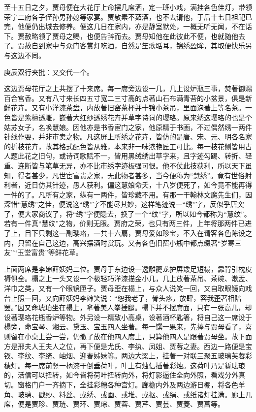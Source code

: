 \begin{parag}
    至十五日之夕，贾母便在大花厅上命摆几席洒，定一班小戏，满挂各色佳灯，带领荣宁二府各子侄孙男孙媳等家宴。贾敬素不茹酒，也不去请他，于后十七日祖祀已完，他便仍出城去修养。便这几日在家内，亦是静室默处，一概无听无闻，不在话下。贾赦略领了贾母之赐，也便告辞而去。贾母知他在此彼此不便，也就随他去了。贾赦自到家中与众门客赏灯吃酒，自然是笙歌聒耳，锦绣盈眸，其取便快乐另与这边不同。\begin{note}庚辰双行夹批：又交代一个。\end{note}
\end{parag}


\begin{parag}
    这边贾母花厅之上共摆了十来席。每一席旁边设一几，几上设炉瓶三事，焚著御赐百合宫香。又有八寸来长四五寸宽二三寸高的点著山石布满青苔的小盆景，俱是新鲜花卉。又有小洋漆茶盘，内放著旧窑茶杯并十锦小茶吊，里面泡著上等名茶。一色皆是紫檀透雕，嵌著大红纱透绣花卉并草字诗词的璎珞。原来绣这璎珞的也是个姑苏女子，名唤慧娘。因他亦是书香宦门之家，他原精于书画，不过偶然绣一两件针线作耍，并非市卖之物。凡这屏上所绣之花卉，皆仿的是唐、宋、元、明各名家的折枝花卉，故其格式配色皆从雅，本来非一味浓艳匠工可比。每一枝花侧皆用古人题此花之旧句，或诗词歌赋不一，皆用黑绒绣出草字来，且字迹勾踢、转折、轻重、连断皆与笔草无异，亦不比市绣字迹板强可恨。他不仗此技获利，所以天下虽知，得者甚少，凡世宦富贵之家，无此物者甚多，当今便称为“慧绣”。竟有世俗射利者，近日仿其针迹，愚人获利。偏这慧娘命夭，十八岁便死了，如今竟不能再得一件的了。凡所有之家，纵有一两件，皆珍藏不用。有那一干翰林文魔先生们，因深惜“慧绣”之佳，便说这“绣”字不能尽其妙，这样笔迹说一“绣”字，反似乎唐突了，便大家商议了，将“绣”字便隐去，换了一个“纹”字，所以如今都称为“慧纹”。若有一件真“慧纹”之物，价则无限。贾府之荣，也只有两三件，上年将那两件已进了上，目下只剩这一副璎珞，一共十六扇，贾母爱如珍宝，不入在请客各色陈设之内，只留在自己这边，高兴摆酒时赏玩。又有各色旧窑小瓶中都点缀著“岁寒三友”“玉堂富贵”等鲜花草。
\end{parag}


\begin{parag}
    上面两席是李婶薛姨妈二位。贾母于东边设一透雕夔龙护屏矮足短榻，靠背引枕皮褥俱全。榻之上一头又设一个极轻巧洋漆描金小几，几上放著茶吊、茶碗、漱盂、洋巾之类，又有一个眼镜匣子。贾母歪在榻上，与众人说笑一回，又自取眼镜向戏台上照一回，又向薛姨妈李婶笑说：“恕我老了，骨头疼，放肆，容我歪著相陪罢。”因又命琥珀坐在榻上，拿著美人拳捶腿。榻下并不摆席面，只有一张高几，却设著璎珞花瓶香炉等物。外另设一精致小高桌，设著酒杯匙箸，将自己这一席设于榻旁，命宝琴、湘云、黛玉、宝玉四人坐著。每一馔一果来，先捧与贾母看了，喜则留在小桌上尝一尝，仍撤了放在他四人席上，只算他四人是跟著贾母坐。故下面方是邢夫人王夫人之位，再下便是尤氏、李纨、凤姐、贾蓉之妻。西边一路便是宝钗、李纹、李绮、岫烟、迎春姊妹等。两边大梁上，挂著一对联三聚五玻璃芙蓉彩穗灯。每一席前竖一柄漆干倒垂荷叶，叶上有烛信插著彩烛。这荷叶乃是錾珐琅的，活信可以扭转，如今皆将荷叶扭转向外，将灯影逼住全向外照，看戏分外真切。窗格门户一齐摘下，全挂彩穗各种宫灯。廊檐内外及两边游日棚，将各色羊角、玻璃、戳纱、料丝、或绣、或画、或堆、或抠、或绢、或纸诸灯挂满。廊上几席，便是贾珍、贾琏、贾环、贾琮、贾蓉、贾芹、贾芸、贾菱、贾菖等。
\end{parag}


